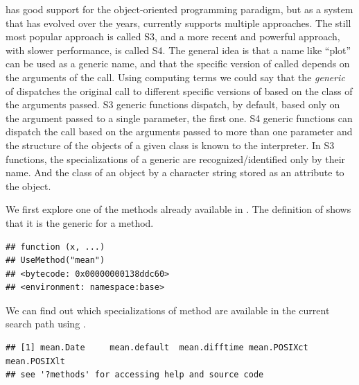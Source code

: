\documentclass[krantz2]{krantz}\usepackage{knitr}
\begin{document}
\Rlang has good support for the object-oriented programming paradigm, but as a system that has evolved over the years, currently \Rlang supports multiple approaches. The still most popular approach is called S3, and a more recent and powerful approach, with slower performance, is called S4. The general idea is that a name like ``plot'' can be used as a generic name, and that the specific version of  called depends on the arguments of the call. Using computing terms we could say that the \emph{generic} of  dispatches the original call to different specific versions of  based on the class of the arguments passed. S3 generic functions dispatch, by default, based only on the argument passed to a single parameter, the first one. S4 generic functions can dispatch the call based on the arguments passed to more than one parameter and the structure of the objects of a given class is known to the interpreter. In S3 functions, the specializations of a generic are recognized/identified only by their name. And the class of an object by a character string stored as an attribute to the object.

We first explore one of the methods already available in \Rlang. The definition of  shows that it is the generic for a method.

\begin{knitrout}\footnotesize
{}\color{fgcolor}\begin{kframe}
\begin{alltt}
\end{alltt}
\begin{verbatim}
## function (x, ...)
## UseMethod("mean")
## <bytecode: 0x00000000138ddc60>
## <environment: namespace:base>
\end{verbatim}
\end{kframe}
\end{knitrout}

We can find out which specializations of method are available in the current search path using .

\begin{knitrout}\footnotesize
{}\color{fgcolor}\begin{kframe}
\begin{alltt}
\end{alltt}
\begin{verbatim}
## [1] mean.Date     mean.default  mean.difftime mean.POSIXct  mean.POSIXlt
## see '?methods' for accessing help and source code
\end{verbatim}
\end{kframe}
\end{knitrout}
\end{document}
